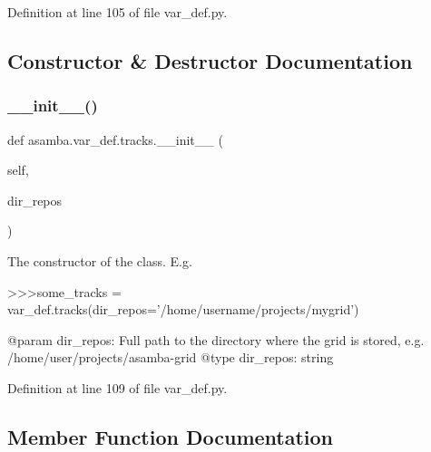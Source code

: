 Definition at line 105 of file var\+\_\+def.\+py.



\subsection{Constructor \& Destructor Documentation}
\mbox{\label{classasamba_1_1var__def_1_1tracks_a317ae0c8a333fcbcf9e907f9f09d4c48}} 
\subsubsection{\texorpdfstring{\+\_\+\+\_\+init\+\_\+\+\_\+()}{\_\_init\_\_()}}
{\footnotesize\ttfamily def asamba.\+var\+\_\+def.\+tracks.\+\_\+\+\_\+init\+\_\+\+\_\+ (\begin{DoxyParamCaption}\item[{}]{self,  }\item[{}]{dir\+\_\+repos }\end{DoxyParamCaption})}

\begin{DoxyVerb}The constructor of the class. E.g.

>>>some_tracks = var_def.tracks(dir_repos='/home/username/projects/mygrid')

@param dir_repos: Full path to the directory where the grid is stored, e.g. 
   /home/user/projects/asamba-grid
@type dir_repos: string
\end{DoxyVerb}
 

Definition at line 109 of file var\+\_\+def.\+py.



\subsection{Member Function Documentation}
\mbox{\label{classasamba_1_1var__def_1_1tracks_abd062bf94f2cd69eab54d2a081bebad1}} 
